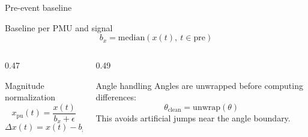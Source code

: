 \documentclass[10pt,aspectratio=169]{beamer}
\begin{document}
\begin{frame}{Pre-event baseline}
\small
\begin{block}{Baseline per PMU and signal}
\[
b_x = \mathrm{median}\left(x(t),\ t \in \mathrm{pre}\right)
\]
\end{block}
\begin{columns}[T,totalwidth=\textwidth]
\begin{column}{0.47\textwidth}
\begin{exampleblock}{Magnitude normalization}
\[
x_{\mathrm{pu}}(t) = \frac{x(t)}{b_x + \epsilon}
\]
\[
\Delta x(t) = x(t) - b_x
\]
\end{exampleblock}
\end{column}
\begin{column}{0.49\textwidth}
\begin{alertblock}{Angle handling}
Angles are unwrapped before computing differences:
\[
\theta_{\mathrm{clean}} = \mathrm{unwrap}(\theta)
\]
This avoids artificial jumps near the angle boundary.
\end{alertblock}
\end{column}
\end{columns}
\end{frame}
\end{document}
